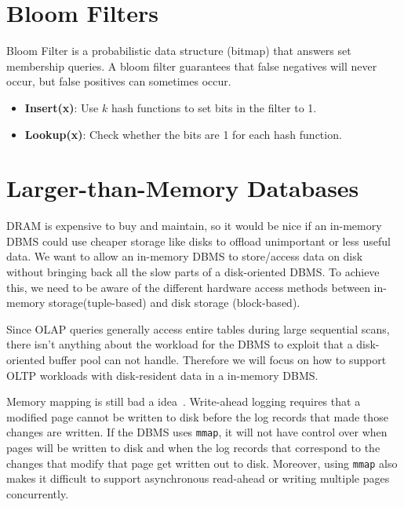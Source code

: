 \documentclass[11pt]{article}
\begin{document}
\maketitle
\thispagestyle{plain}

\section{Bloom Filters}
Bloom Filter is a probabilistic data structure (bitmap) that answers set membership queries. A bloom filter guarantees that false negatives will never occur, but false positives can sometimes occur.

\begin{itemize}
    \item \textbf{Insert(x)}: Use $k$ hash functions to set bits in the filter to 1.
    \item \textbf{Lookup(x)}: Check whether the bits are 1 for each hash function.
\end{itemize}

\section{Larger-than-Memory Databases}
DRAM is expensive to buy and maintain, so it would be nice if an in-memory DBMS could use cheaper storage like disks to offload unimportant or less useful data. We want to allow an in-memory DBMS to store/access data on disk without bringing back all the slow parts of a disk-oriented DBMS. To achieve this, we need to be aware of the different hardware access methods between in-memory storage(tuple-based) and disk storage (block-based).

Since OLAP queries generally access entire tables during large sequential scans, there isn't anything about the workload for the DBMS to exploit that a disk-oriented buffer pool can not handle. Therefore we will focus on how to support OLTP workloads with disk-resident data in a in-memory DBMS.

Memory mapping is still bad a idea~\cite{Graefe:2014}. Write-ahead logging requires that a modified page cannot be written to disk before the log records that made those changes are written. If the DBMS uses \texttt{mmap}, it will not have control over when pages will be written to disk and when the log records that correspond to the changes that modify that page get written out to disk. Moreover, using \texttt{mmap} also makes it difficult to support asynchronous read-ahead or writing multiple pages concurrently.
\end{document}
